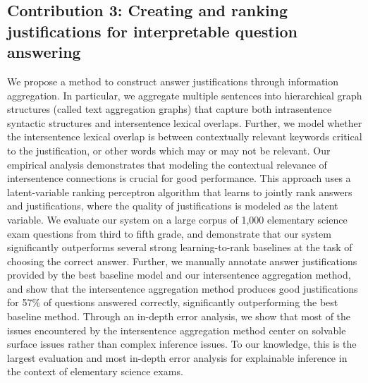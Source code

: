 \subsection{Contribution 3: Creating and ranking justifications for interpretable question answering} We propose a method to construct answer justifications through information aggregation. 
In particular, we aggregate multiple sentences into hierarchical graph structures (called text aggregation graphs) that capture both intrasentence syntactic structures and intersentence lexical overlaps. 
Further, we model whether the intersentence lexical overlap is between contextually relevant keywords critical to the justification, or other words which may or may not be relevant. 
Our empirical analysis demonstrates that modeling the contextual relevance of intersentence connections is crucial for good performance.  %
This approach uses a latent-variable ranking perceptron algorithm that learns to jointly rank answers and justifications, where the quality of justifications is modeled as the latent variable. 
We evaluate our system on a large corpus of 1,000 elementary science exam questions from third to fifth grade, and demonstrate that our system significantly outperforms several strong learning-to-rank baselines at the task of choosing the correct answer.  Further, we manually annotate answer justifications provided by the best baseline model and our intersentence aggregation method, and show that the intersentence aggregation method produces good justifications for 57\% of questions answered correctly, significantly outperforming the best baseline method. 
Through an in-depth error analysis, we show that most of the issues encountered by the intersentence aggregation method center on solvable surface issues rather than complex inference issues.  To our knowledge, this is the largest evaluation and most in-depth error analysis for explainable inference in the context of elementary science exams. 



